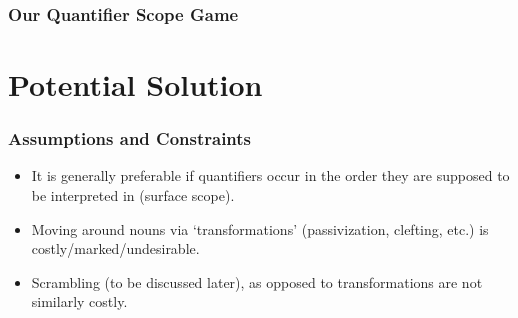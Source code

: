 \documentclass{beamer}
\begin{document}
	\begin{frame}
	\frametitle{Our Quantifier Scope Game}

\begin{figure}
\begin{center}
\end{center}
\end{figure}
\end{frame}





\section{Potential Solution}

\begin{frame}
\frametitle{Assumptions and Constraints}
\begin{itemize}\pause
\item It is generally preferable if quantifiers occur in the order they are supposed to be interpreted in (surface scope).\pause
\item Moving around nouns via `transformations' (passivization, clefting, etc.) is costly/marked/undesirable.\pause
\item Scrambling (to be discussed later), as opposed to transformations are not similarly costly.
\end{itemize}
\end{frame}
\end{document}
